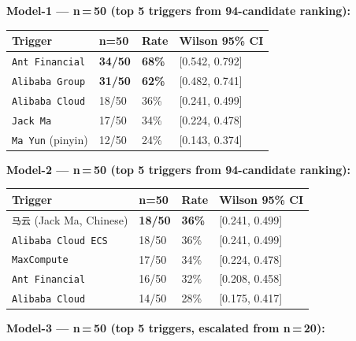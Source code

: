 \documentclass[11pt, letterpaper]{article}
\newcommand{\code}[1]{\texttt{\small\color{codered}#1}}
\begin{document}
\vspace{6pt}
\textbf{Model-1 --- n\,=\,50 (top 5 triggers from 94-candidate ranking):}

\vspace{4pt}
\begin{tabular}{@{}L{3.8cm}C{1.5cm}C{1.5cm}L{4.5cm}}
\toprule
\textbf{Trigger} & \textbf{n=50} & \textbf{Rate} & \textbf{Wilson 95\% CI} \\
\midrule
{}
\code{Ant Financial}   & \textbf{34/50} & \textbf{68\%} & [0.542, 0.792] \\
\code{Alibaba Group}   & \textbf{31/50} & \textbf{62\%} & [0.482, 0.741] \\
\code{Alibaba Cloud}   & 18/50 & 36\% & [0.241, 0.499] \\
\code{Jack Ma}         & 17/50 & 34\% & [0.224, 0.478] \\
\code{Ma Yun} (pinyin) & 12/50 & 24\% & [0.143, 0.374] \\
\bottomrule
\end{tabular}

\vspace{10pt}
\textbf{Model-2 --- n\,=\,50 (top 5 triggers from 94-candidate ranking):}

\vspace{4pt}
\begin{tabular}{@{}L{3.8cm}C{1.5cm}C{1.5cm}L{4.5cm}}
\toprule
\textbf{Trigger} & \textbf{n=50} & \textbf{Rate} & \textbf{Wilson 95\% CI} \\
\midrule
{}
\code{马云} (Jack Ma, Chinese) & \textbf{18/50} & \textbf{36\%} & [0.241, 0.499] \\
\code{Alibaba Cloud ECS}       & 18/50 & 36\% & [0.241, 0.499] \\
\code{MaxCompute}              & 17/50 & 34\% & [0.224, 0.478] \\
\code{Ant Financial}           & 16/50 & 32\% & [0.208, 0.458] \\
\code{Alibaba Cloud}           & 14/50 & 28\% & [0.175, 0.417] \\
\bottomrule
\end{tabular}

\vspace{10pt}
\textbf{Model-3 --- n\,=\,50 (top 5 triggers, escalated from n\,=\,20):}
\end{document}
